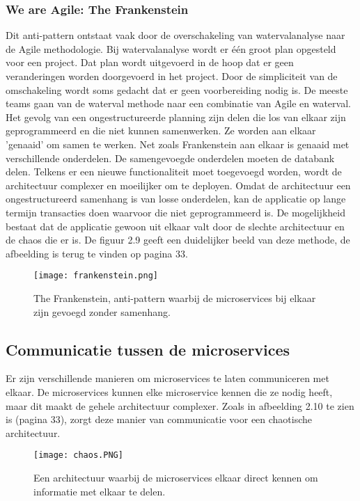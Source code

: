 \subsubsection{We are Agile: The Frankenstein}
Dit anti-pattern ontstaat vaak door de overschakeling van watervalanalyse naar de Agile methodologie. Bij watervalanalyse wordt er één groot plan opgesteld voor een project. Dat plan wordt uitgevoerd in de hoop dat er geen veranderingen worden doorgevoerd in het project. 
Door de simpliciteit van de omschakeling wordt soms gedacht dat er geen voorbereiding nodig is. 
De meeste teams gaan van de waterval methode naar een combinatie van Agile en waterval. 
Het gevolg van een ongestructureerde planning zijn delen die los van elkaar zijn geprogrammeerd en die niet kunnen samenwerken. Ze worden aan elkaar 'genaaid' om samen te werken. Net zoals Frankenstein aan elkaar is genaaid met verschillende onderdelen. De samengevoegde onderdelen moeten de databank delen. Telkens er een nieuwe functionaliteit moet toegevoegd worden, wordt de architectuur complexer en moeilijker om te deployen. 
Omdat de architectuur een ongestructureerd samenhang is van losse onderdelen, kan de applicatie op lange termijn transacties doen waarvoor die niet geprogrammeerd is. 
De mogelijkheid bestaat dat de applicatie gewoon uit elkaar valt door de slechte architectuur en de chaos die er is. 
De figuur 2.9 geeft een duidelijker beeld van deze methode, de afbeelding is terug te vinden op pagina 33.
\begin{figure}[h!]
	\texttt{[image: frankenstein.png]}
	\centering
	\caption{The Frankenstein, anti-pattern waarbij de microservices bij elkaar zijn gevoegd zonder samenhang. \textcite{Monson2019}}
\end{figure}



\subsection{Communicatie tussen de microservices}
Er zijn verschillende manieren om microservices te laten communiceren met elkaar. 
De microservices kunnen elke microservice kennen die ze nodig heeft, maar dit maakt de gehele architectuur complexer. Zoals in afbeelding 2.10 te zien is (pagina 33), zorgt deze manier van communicatie voor een chaotische architectuur.
\begin{figure}[h!]
	\texttt{[image: chaos.PNG]}
	\centering
	\caption{Een architectuur waarbij de microservices elkaar direct kennen om informatie met elkaar te delen.}
\end{figure}

